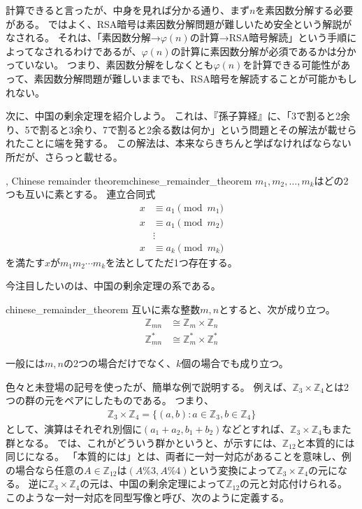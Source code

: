 
計算できると言ったが、中身を見れば分かる通り、まず$n$を素因数分解する必要がある。
ではよく、RSA暗号は素因数分解問題が難しいため安全という解説がなされる。
それは、「素因数分解→$\varphi(n)$の計算→RSA暗号解読」という手順によってなされるわけであるが、$\varphi(n)$の計算に素因数分解が必須であるかは分かっていない。
つまり、素因数分解をしなくとも$\varphi(n)$を計算できる可能性があって、素因数分解問題が難しいままでも、RSA暗号を解読することが可能かもしれない。

次に、中国の剰余定理を紹介しよう。
これは、『孫子算経』に、「3で割ると2余り、5で割ると3余り、7で割ると2余る数は何か」という問題とその解法が載せられたことに端を発する。
この解法は、本来ならきちんと学ばなければならない所だが、さらっと載せる。

\begin{Theo}{, Chinese remainder theorem}{chinese_remainder_theorem}
$m_1,m_2,\ldots,m_k$はどの2つも互いに素とする。
連立合同式
\begin{align*}
x &\equiv a_1 \pmod{m_1}\\
x &\equiv a_1 \pmod{m_2}\\
&\vdots\\
x &\equiv a_k \pmod{m_k}
\end{align*}
を満たす$x$が$m_1m_2\cdots m_k$を法としてただ1つ存在する。
\end{Theo}


今注目したいのは、中国の剰余定理の系である。

\begin{Coro}{}{chinese_remainder_theorem}
互いに素な整数$m,n$とすると、次が成り立つ。
\begin{align*}
\mathbb{Z}_{mn} &\cong \mathbb{Z}_m \times \mathbb{Z}_n\\
\mathbb{Z}_{mn}^* &\cong \mathbb{Z}_m^* \times \mathbb{Z}_n^*
\end{align*}
\end{Coro}

一般には$m,n$の2つの場合だけでなく、$k$個の場合でも成り立つ。

色々と未登場の記号を使ったが、簡単な例で説明する。
例えば、$\mathbb{Z}_3\times\mathbb{Z}_4$とは2つの群の元をペアにしたものである。
つまり、
\begin{align*}
\mathbb{Z}_3\times\mathbb{Z}_4 = \{(a,b) : a \in \mathbb{Z}_3, b \in \mathbb{Z}_4\}
\end{align*}
として、演算はそれぞれ別個に$(a_1+a_2,b_1+b_2)$などとすれば、$\mathbb{Z}_3\times\mathbb{Z}_4$もまた群となる。
では、これがどういう群かというと、が示すには、$\mathbb{Z}_{12}$と本質的には同じになる。
「本質的には」とは、両者に一対一対応があることを意味し、例の場合なら任意の$A\in\mathbb{Z}_{12}$は$(A \% 3, A \% 4)$という変換によって$\mathbb{Z}_3\times\mathbb{Z}_4$の元になる。
逆に$\mathbb{Z}_3\times\mathbb{Z}_4$の元は、中国の剰余定理によって$\mathbb{Z}_{12}$の元と対応付けられる。
このような一対一対応を同型写像と呼び、次のように定義する。


